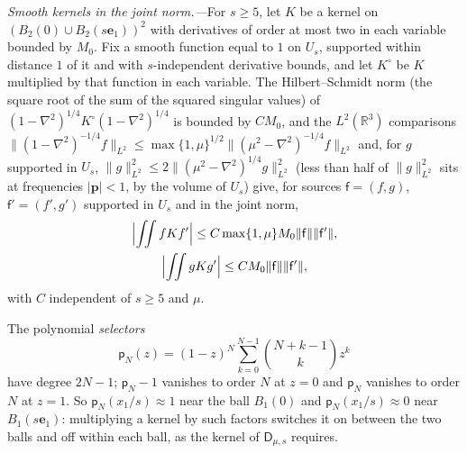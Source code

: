 \documentclass[aps,prl,reprint,longbibliography,raggedbottom]{revtex4-2}
\newcommand{\R}{\mathbb R}
\newcommand{\norm}[1]{\lVert #1\rVert}
\newcommand{\abs}[1]{\lvert #1\rvert}
\newcommand{\JointD}{\mathsf D}
\newcommand{\sx}{\mathsf f}
\newcommand{\sy}{\mathsf f'}
\newcommand{\bp}{\mathbf p}
\newcommand{\eone}{\mathbf e_1}
\begin{document}
\emph{Smooth kernels in the joint norm.---}For $s\ge5$, let $K$ be a
kernel on $(B_2(0)\cup B_2(s\eone))^2$ with derivatives of order at
most two in each variable bounded by $M_0$. Fix a smooth function equal
to $1$ on $U_s$, supported within distance $1$ of it and with
$s$-independent derivative bounds, and let $K^\circ$ be $K$ multiplied
by that function in each variable. The Hilbert--Schmidt norm (the
square root of the sum of the squared singular values) of
$(1-\nabla^2)^{1/4}K^\circ(1-\nabla^2)^{1/4}$ is bounded by $CM_0$,
and the $L^2(\R^3)$ comparisons
$\norm{(1-\nabla^2)^{-1/4}f}_{L^2}
\le\max\{1,\mu\}^{1/2}\norm{({\mu^2-\nabla^2})^{-1/4}f}_{L^2}$ and,
for $g$ supported in $U_s$,
$\norm g_{L^2}^2\le2\norm{(\mu^2-\nabla^2)^{1/4}g}_{L^2}^2$ (less
than half of $\norm g_{L^2}^2$ sits at frequencies $\abs\bp<1$, by the
volume of $U_s$) give, for sources $\sx=(f,g)$, $\sy=(f',g')$ supported
in $U_s$ and in the joint norm,
\begin{equation}
\begin{gathered}
\Bigl|\iint fKf'\Bigr|\le C\max\{1,\mu\}M_0\norm\sx\norm\sy,\\
\Bigl|\iint gKg'\Bigr|\le CM_0\norm\sx\norm\sy ,
\end{gathered}
\label{eq:smooth-kernel}
\end{equation}
with $C$ independent of $s\ge5$ and $\mu$.

The polynomial \emph{selectors}
\begin{equation}
\mathsf p_N(z)=(1-z)^N\sum_{k=0}^{N-1}\binom{N+k-1}kz^k
\label{eq:selectors}
\end{equation}
have degree $2N-1$; $\mathsf p_N-1$ vanishes to order $N$ at $z=0$ and
$\mathsf p_N$ vanishes to order $N$ at $z=1$. So
$\mathsf p_N(x_1/s)\approx1$ near the ball $B_1(0)$ and
$\mathsf p_N(x_1/s)\approx0$ near $B_1(s\eone)$: multiplying a kernel
by such factors switches it on between the two balls and off within
each ball, as the kernel of $\JointD_{\mu,s}$ requires.
\end{document}
